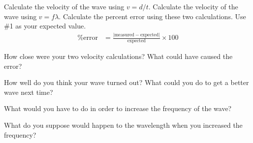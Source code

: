 \documentclass[10pt]{exam}
\begin{document}
\begin{questions}

  \question
    Calculate the velocity of the wave using $v=d/t$. \vs 
  \question 
    Calculate the velocity of the wave using $v=f\lambda$. \vs 
  \question 
    Calculate the percent error using these two calculations.  Use \#1 as your expected value.
    \begin{align*}
      \text{\% error} &=  
      \frac{
        \left|\text{measured}-\text{expected}\right|
        }{
          \text{expected}
        } 
      \times 100
    \end{align*}
    \vs



    \question
      How close were your two velocity calculations?  What could have caused the error?
      \vs 

    \question
      How well do you think your wave turned out?  What could you do to get a better wave next time?
      \vs
    
    \question
      What would you have to do in order to increase the frequency of the wave?
      \vs 

    \question
      What do you suppose would happen to the wavelength when you increased the frequency?
      \vs

\end{questions}

\pagebreak
\end{document}
